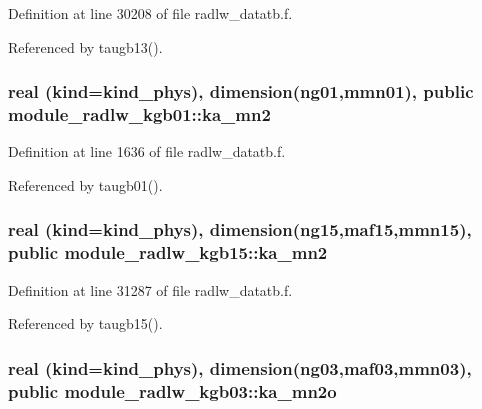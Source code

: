 Definition at line 30208 of file radlw\+\_\+datatb.\+f.



Referenced by taugb13().

\subsubsection[{\texorpdfstring{ka\+\_\+mn2}{ka_mn2}}]{\setlength{\rightskip}{0pt plus 5cm}real (kind=kind\+\_\+phys), dimension(ng01,mmn01), public module\+\_\+radlw\+\_\+kgb01\+::ka\+\_\+mn2}\hypertarget{group__module__radlw__main_ga0a4f08c625f2f25f132200811af42331}{}\label{group__module__radlw__main_ga0a4f08c625f2f25f132200811af42331}


Definition at line 1636 of file radlw\+\_\+datatb.\+f.



Referenced by taugb01().

\subsubsection[{\texorpdfstring{ka\+\_\+mn2}{ka_mn2}}]{\setlength{\rightskip}{0pt plus 5cm}real (kind=kind\+\_\+phys), dimension(ng15,maf15,mmn15), public module\+\_\+radlw\+\_\+kgb15\+::ka\+\_\+mn2}\hypertarget{group__module__radlw__main_gaff32d89fe8fef50ff79136cc7aa50526}{}\label{group__module__radlw__main_gaff32d89fe8fef50ff79136cc7aa50526}


Definition at line 31287 of file radlw\+\_\+datatb.\+f.



Referenced by taugb15().

\subsubsection[{\texorpdfstring{ka\+\_\+mn2o}{ka_mn2o}}]{\setlength{\rightskip}{0pt plus 5cm}real (kind=kind\+\_\+phys), dimension(ng03,maf03,mmn03), public module\+\_\+radlw\+\_\+kgb03\+::ka\+\_\+mn2o}\hypertarget{group__module__radlw__main_gaeeba4e0a8fc97c557e1127b4d5d1bd94}{}\label{group__module__radlw__main_gaeeba4e0a8fc97c557e1127b4d5d1bd94}


